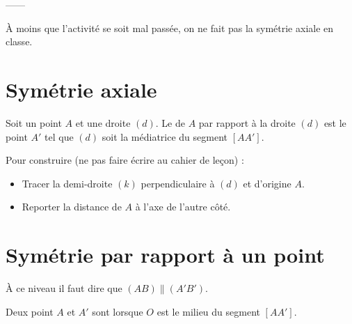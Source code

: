 





------

À moins que l'activité se soit mal passée, on ne fait pas la symétrie axiale en classe.

\section*{Symétrie axiale}

\begin{definition}
    Soit un point \( A\) et une droite \( (d)\). Le  de \( A\) par rapport à la droite \( (d)\) est le point \( A'\) tel que \( (d)\) soit la médiatrice du segment \( [AA']\).
\end{definition}

Pour construire (ne pas faire écrire au cahier de leçon) :
\begin{itemize}
    \item Tracer la demi-droite \( (k)\) perpendiculaire à \( (d)\) et d'origine \( A\).
    \item Reporter la distance de \( A\) à l'axe de l'autre côté.
\end{itemize}

\section{Symétrie par rapport à un point}



À ce niveau il faut dire que \( (AB)\parallel (A'B')\).

\begin{definition}
    Deux point \( A\) et \( A'\) sont  lorsque \( O\) est le milieu du segment \( [AA']\). 
\end{definition}

